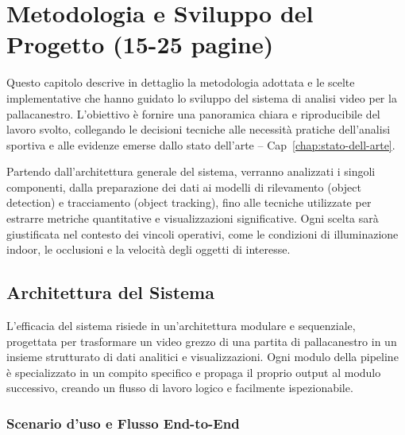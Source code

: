 \documentclass[12pt,a4paper,openright,twoside]{book}
\begin{document}
\chapter{Metodologia e Sviluppo del Progetto (15-25 pagine)}
\label{chap:metodologia-sviluppo}
Questo capitolo descrive in dettaglio la metodologia adottata e le scelte implementative che hanno guidato lo sviluppo 
del sistema di analisi video per la pallacanestro. L'obiettivo è fornire una panoramica chiara e riproducibile del lavoro 
svolto, collegando le decisioni tecniche alle necessità pratiche dell'analisi sportiva e alle evidenze emerse dallo 
stato dell'arte -- Cap~\ref{chap:stato-dell-arte}.

Partendo dall'architettura generale del sistema, verranno analizzati i singoli componenti, dalla preparazione dei dati 
ai modelli di rilevamento (object detection) e tracciamento (object tracking), fino alle tecniche utilizzate per estrarre 
metriche quantitative e visualizzazioni significative.
Ogni scelta sarà giustificata nel contesto dei vincoli operativi, come le
condizioni di illuminazione indoor, le occlusioni e la velocità degli oggetti di interesse.

\section{Architettura del Sistema}
\label{sec:architettura-sistema}

L'efficacia del sistema risiede in un'architettura modulare e sequenziale, progettata per trasformare un video grezzo 
di una partita di pallacanestro in un insieme strutturato di dati analitici e visualizzazioni. 
Ogni modulo della pipeline è specializzato in un compito specifico e propaga il proprio output al modulo successivo, creando
un flusso di lavoro logico e facilmente ispezionabile.

\subsection{Scenario d'uso e Flusso End-to-End}
\end{document}
